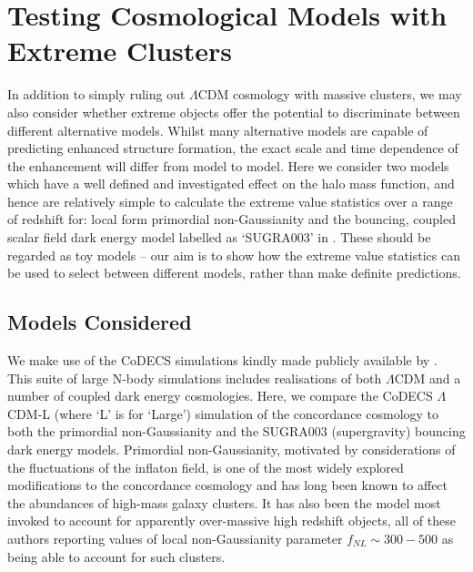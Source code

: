 \documentclass[twocolumn,useAMS,usenatbib,usegraphicx]{mn2e}
\newcommand{\lcdm}{$\Lambda$CDM }
\begin{document}
\section{Testing Cosmological Models with Extreme Clusters}
\label{sec:codecs} In addition to simply ruling out \lcdm cosmology
with massive clusters, we may also consider whether extreme objects
offer the potential to discriminate between different alternative
models. Whilst many alternative models are capable of predicting
enhanced structure formation, the exact scale and time dependence of
the enhancement will differ from model to model. Here we consider
two models which have a well defined and investigated effect on the
halo mass function, and hence are relatively simple to calculate the
extreme value statistics over a range of redshift for: local form
primordial non-Gaussianity and the bouncing, coupled scalar field
dark energy model labelled as `SUGRA003' in \cite{Baldi2011}. These
should be regarded as toy models -- our aim is to show how the
extreme value statistics can be used to select between different
models, rather than make definite predictions.
\subsection{Models Considered}
We make use of the CoDECS simulations kindly made publicly available
by \cite{Baldi2010, Baldi2011a}. This suite of large N-body
simulations includes realisations of both \lcdm and a number of
coupled dark energy cosmologies. Here, we compare the CoDECS
$\Lambda$CDM-L (where `L' is for `Large') simulation of the
concordance cosmology to both the primordial non-Gaussianity and the
SUGRA003 (supergravity) bouncing dark energy models. Primordial
non-Gaussianity, motivated by considerations of the fluctuations of
the inflaton field, is one of the most widely explored modifications
to the concordance cosmology \citep[e.g.][]{Desjacques2010} and has
long \citep{Lucchin1988a} been known to affect the abundances of
high-mass galaxy clusters. It has also been the model most invoked
\citep{Jimenez2009, Cay'on2011, Chongchitnan2011, Hoyle2011b} to
account for apparently over-massive high redshift objects, all of
these authors reporting values of local non-Gaussianity parameter
$f_{NL} \sim 300-500$ as being able to account for such clusters.
\end{document}
